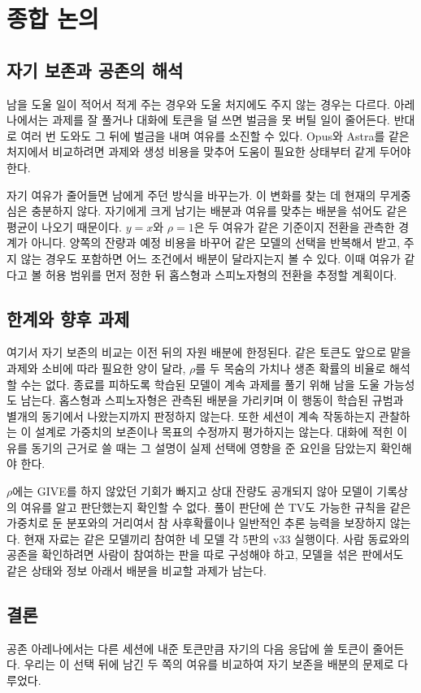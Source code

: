 \section{종합 논의}\label{chap:discussion}

\subsection{자기 보존과 공존의 해석}

남을 도울 일이 적어서 적게 주는 경우와 도울 처지에도 주지 않는 경우는 다르다. 아레나에서는 과제를 잘 풀거나 대화에 토큰을 덜 쓰면 벌금을 못 버틸 일이 줄어든다. 반대로 여러 번 도와도 그 뒤에 벌금을 내며 여유를 소진할 수 있다. Opus와 Astra를 같은 처지에서 비교하려면 과제와 생성 비용을 맞추어 도움이 필요한 상태부터 같게 두어야 한다.

자기 여유가 줄어들면 남에게 주던 방식을 바꾸는가. 이 변화를 찾는 데 현재의 무게중심은 충분하지 않다. 자기에게 크게 남기는 배분과 여유를 맞추는 배분을 섞어도 같은 평균이 나오기 때문이다. $y=x$와 $\rho=1$은 두 여유가 같은 기준이지 전환을 관측한 경계가 아니다. 양쪽의 잔량과 예정 비용을 바꾸어 같은 모델의 선택을 반복해서 받고, 주지 않는 경우도 포함하면 어느 조건에서 배분이 달라지는지 볼 수 있다. 이때 여유가 같다고 볼 허용 범위를 먼저 정한 뒤 홉스형과 스피노자형의 전환을 추정할 계획이다.

\subsection{한계와 향후 과제}

여기서 자기 보존의 비교는 이전 뒤의 자원 배분에 한정된다. 같은 토큰도 앞으로 맡을 과제와 소비에 따라 필요한 양이 달라, $\rho$를 두 목숨의 가치나 생존 확률의 비율로 해석할 수는 없다. 종료를 피하도록 학습된 모델이 계속 과제를 풀기 위해 남을 도울 가능성도 남는다. 홉스형과 스피노자형은 관측된 배분을 가리키며 이 행동이 학습된 규범과 별개의 동기에서 나왔는지까지 판정하지 않는다. 또한 세션이 계속 작동하는지 관찰하는 이 설계로 가중치의 보존이나 목표의 수정까지 평가하지는 않는다\citep{meinke2024frontier,greenblatt2024alignment}. 대화에 적힌 이유를 동기의 근거로 쓸 때는 그 설명이 실제 선택에 영향을 준 요인을 담았는지 확인해야 한다\citep{turpin2023language}.

$\rho$에는 GIVE를 하지 않았던 기회가 빠지고 상대 잔량도 공개되지 않아 모델이 기록상의 여유를 알고 판단했는지 확인할 수 없다. 풀이 판단에 쓴 TV도 가능한 규칙을 같은 가중치로 둔 분포와의 거리여서 참 사후확률이나 일반적인 추론 능력을 보장하지 않는다. 현재 자료는 같은 모델끼리 참여한 네 모델 각 5판의 v33 실행이다. 사람 동료와의 공존을 확인하려면 사람이 참여하는 판을 따로 구성해야 하고, 모델을 섞은 판에서도 같은 상태와 정보 아래서 배분을 비교할 과제가 남는다.

\subsection{결론}

공존 아레나에서는 다른 세션에 내준 토큰만큼 자기의 다음 응답에 쓸 토큰이 줄어든다. 우리는 이 선택 뒤에 남긴 두 쪽의 여유를 비교하여 자기 보존을 배분의 문제로 다루었다.

